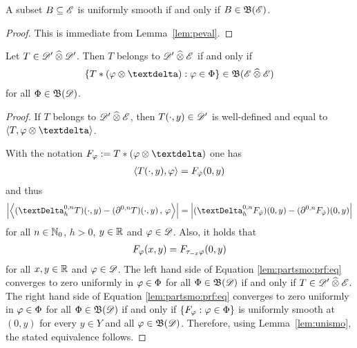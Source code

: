 \begin{lemma}
    \label{lem:unismo}
    A subset $ B \subseteq \mathscr{  E  } $ is uniformly smooth
    if and only if $ B \in \operatorname{\mathfrak{ B }}(\mathscr{  E  }) $.
\end{lemma}

\begin{proof}
    This is immediate from Lemma~\ref{lem:peval}.
\end{proof}

\begin{lemma}
    \label{lem:partsmo}
    Let $ T \in \mathscr{  D  }' \mathbin{\widehat{\otimes}} \mathscr{  D  }' $.
    Then $ T $ belongs to $ \mathscr{  D  }' \mathbin{\widehat{\otimes}} \mathscr{  E  } $ if and only if
    \begin{align}
        \brmSet{ T * ( \ph \tepro \sfdeo ) }{ \ph \in \Ph }
        \in
        \ssBnd( \fsSmo \ctepro \fsSmo )
        \label{lem:partsmo:eq}
    \end{align}
    for all $ \Phi \in \operatorname{\mathfrak{ B }}(\mathscr{  D  }) $.
\end{lemma}

\begin{proof}
    If $ T $ belongs to $ \mathscr{  D  }' \mathbin{\widehat{\otimes}} \mathscr{  E  } $,
    then $ T(\cdot,y) \in \mathscr{  D  }' $ is well-defined
    and equal to $ \ska{ T }{ \ph \tepro \sfdeo } $.

    With the notation $ F_\ph := T * ( \ph \tepro \sfdeo ) $ one has
    \begin{align}
        \langle  T( \cdot, y )  ,  \varphi  \rangle
        =
        F_{\check{ \varphi }}( 0, y )
    \end{align}
    and thus
    \begin{align}
        \Abs{ \Ska{ ( \tDe^{0,n}_h T )( \cdot, y )  -
        ( \partial^{0,n}T )( \cdot, y ) }{ \ph } }
        =
        \Abs{ ( \tDe^{0,n}_h F_{\refl{\ph}} )(0,y)  -
        ( \partial^{0,n} F_{\refl{\ph}} )(0,y) }
        \label{lem:partsmo:prf:eq}
    \end{align}
    for all $ n \in \mathbb{ N }_0 $, $ h > 0 $, $ y \in \mathbb{ R } $ and $ \varphi \in \mathscr{  D  } $.
    Also, it holds that
    \begin{align}
        F_\varphi(x,y) = F_{\tau_{-x}\varphi}(0,y)
    \end{align}
    for all $ x,y \in \mathbb{ R } $ and $ \varphi \in \mathscr{  D  } $.
    The left hand side of Equation \eqref{lem:partsmo:prf:eq}
    converges to zero uniformly in $ \varphi \in \Phi $ for all $ \Phi \in \operatorname{\mathfrak{ B }}(\mathscr{  D  }) $
    if and only if $ T \in \mathscr{  D  }' \mathbin{\widehat{\otimes}} \mathscr{  E  } $.
    The right hand side of Equation \eqref{lem:partsmo:prf:eq}
    converges to zero uniformly in $ \varphi \in \Phi $ for all $ \Phi \in \operatorname{\mathfrak{ B }}(\mathscr{  D  }) $
    if and only if $ \{   F_\varphi  :  \varphi \in \Phi   \} $
    is uniformly smooth at $ (0,y) $ for every $ y \in Y $
    and all $ \varphi \in \operatorname{\mathfrak{ B }}(\mathscr{  D  }) $.
    Therefore, using Lemma~\ref{lem:unismo}, the stated equivalence follows.
\end{proof}

